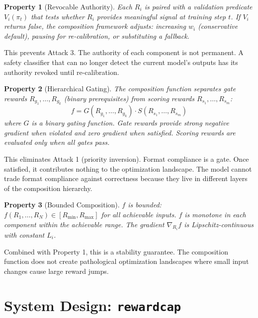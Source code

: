 \documentclass[11pt,a4paper]{article}
\newtheorem{property}{Property}
\begin{document}
\begin{property}[Revocable Authority]
Each $R_i$ is paired with a validation predicate $V_i(\pi_t)$ that tests whether $R_i$ provides meaningful signal at training step $t$. If $V_i$ returns false, the composition framework adjusts: increasing $w_i$ (conservative default), pausing for re-calibration, or substituting a fallback.
\end{property}

This prevents Attack 3. The authority of each component is not permanent. A safety classifier that can no longer detect the current model's outputs has its authority revoked until re-calibration.

\begin{property}[Hierarchical Gating]
The composition function separates gate rewards $R_{g_1}, \ldots, R_{g_k}$ (binary prerequisites) from scoring rewards $R_{s_1}, \ldots, R_{s_m}$:
\begin{equation}
f = G(R_{g_1}, \ldots, R_{g_k}) \cdot S(R_{s_1}, \ldots, R_{s_m})
\end{equation}
where $G$ is a binary gating function. Gate rewards provide strong negative gradient when violated and zero gradient when satisfied. Scoring rewards are evaluated only when all gates pass.
\end{property}

This eliminates Attack 1 (priority inversion). Format compliance is a gate. Once satisfied, it contributes nothing to the optimization landscape. The model cannot trade format compliance against correctness because they live in different layers of the composition hierarchy.

\begin{property}[Bounded Composition]
$f$ is bounded: $f(R_1, \ldots, R_N) \in [R_{\min}, R_{\max}]$ for all achievable inputs. $f$ is monotone in each component within the achievable range. The gradient $\nabla_{R_i} f$ is Lipschitz-continuous with constant $L_i$.
\end{property}

Combined with Property 1, this is a stability guarantee. The composition function does not create pathological optimization landscapes where small input changes cause large reward jumps.

\section{System Design: \texttt{rewardcap}}
\end{document}
